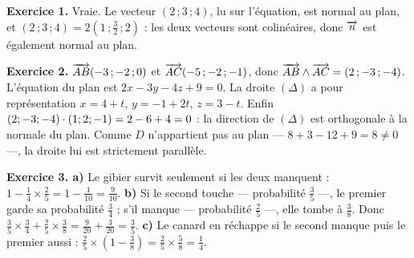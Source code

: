 \begin{corrige}
\textbf{Exercice 1.} Vraie. Le vecteur $(2\,;3\,;4)$, lu sur l'équation, est normal
au plan, et $(2\,;3\,;4) = 2\left(1\,;\frac32\,;2\right)$ : les deux vecteurs
sont colinéaires, donc $\overrightarrow{n}$ est également normal au plan.

\textbf{Exercice 2.} $\overrightarrow{AB}(-3\,;-2\,;0)$ et $\overrightarrow{AC}(-5\,;-2\,;-1)$, donc
$\overrightarrow{AB} \wedge \overrightarrow{AC} = (2\,;-3\,;-4)$. L'équation du plan est
$2x-3y-4z+9 = 0$. La droite $(\Delta)$ a pour représentation
$x = 4+t$, $y = -1+2t$, $z = 3-t$. Enfin
$(2;-3;-4) \cdot (1;2;-1) = 2-6+4 = 0$ : la direction de $(\Delta)$ est
orthogonale à la normale du plan. Comme $D$ n'appartient pas au plan
— $8+3-12+9 = 8 \neq 0$ —, la droite lui est strictement parallèle.

\textbf{Exercice 3. a)} Le gibier survit seulement si les deux manquent :
$1-\frac14 \times \frac25 = 1-\frac{1}{10} = \frac{9}{10}$.
\textbf{b)} Si le second touche — probabilité $\frac35$ —, le premier garde sa
probabilité $\frac34$ ; s'il manque — probabilité $\frac25$ —, elle tombe à
$\frac38$. Donc
$\frac35 \times \frac34+\frac25 \times \frac38 = \frac{9}{20}+\frac{3}{20}
= \frac35$.
\textbf{c)} Le canard en réchappe si le second manque puis le premier aussi :
$\frac25 \times \left(1-\frac38\right) = \frac25 \times \frac58 = \frac14$.

\end{corrige}
